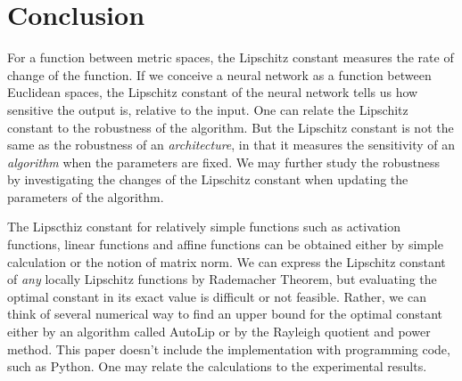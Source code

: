 \documentclass[11pt]{report}
\begin{document}
\chapter{Conclusion}
For a function between metric spaces, the Lipschitz constant measures the rate of change of the function.
If we conceive a neural network as a function between Euclidean spaces, the Lipschitz constant of the neural network tells us how sensitive the output is, relative to the input.
One can relate the Lipschitz constant to the robustness of the algorithm.
But the Lipschitz constant is not the same as the robustness of an \emph{architecture}, in that it measures the sensitivity of an \emph{algorithm} when the parameters are fixed.
We may further study the robustness by investigating the changes of the Lipschitz constant when updating the parameters of the algorithm.

The Lipscthiz constant for relatively simple functions such as activation functions, linear functions and affine functions can be obtained either by simple calculation or the notion of matrix norm.
We can express the Lipschitz constant of \emph{any} locally Lipschitz functions by Rademacher Theorem, but evaluating the optimal constant in its exact value is difficult or not feasible.
Rather, we can think of several numerical way to find an upper bound for the optimal constant either by an algorithm called AutoLip or by the Rayleigh quotient and power method.
This paper doesn't include the implementation with programming code, such as Python.
One may relate the calculations to the experimental results.
\end{document}
